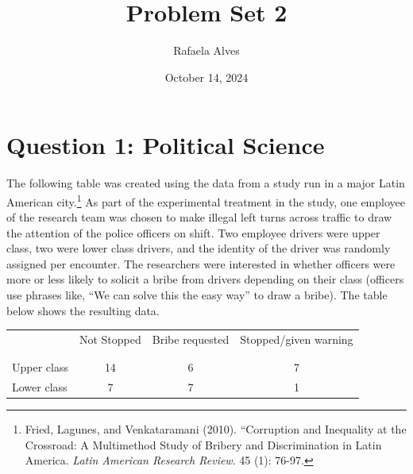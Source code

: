 \documentclass[12pt,letterpaper]{article}
\title{Problem Set 2}
\date{October 14, 2024}
\author{Rafaela Alves}
\begin{document}
		\maketitle


	\section*{Question 1: Political Science}
		\vspace{.5cm}
	The following table was created using the data from a study run in a major Latin American city.\footnote{Fried, Lagunes, and Venkataramani (2010). ``Corruption and Inequality at the Crossroad: A Multimethod Study of Bribery and Discrimination in Latin America. \textit{Latin American Research Review}. 45 (1): 76-97.} As part of the experimental treatment in the study, one employee of the research team was chosen to make illegal left turns across traffic to draw the attention of the police officers on shift. Two employee drivers were upper class, two were lower class drivers, and the identity of the driver was randomly assigned per encounter. The researchers were interested in whether officers were more or less likely to solicit a bribe from drivers depending on their class (officers use phrases like, ``We can solve this the easy way'' to draw a bribe). The table below shows the resulting data.


\begin{table}[h!]
	\centering
	\begin{tabular}{l | c c c }
		& Not Stopped & Bribe requested & Stopped/given warning \\
		\\[-1.8ex] 
		\hline \\[-1.8ex]
		Upper class & 14 & 6 & 7 \\
		Lower class & 7 & 7 & 1 \\
		\hline
	\end{tabular}
\end{table}
\end{document}
